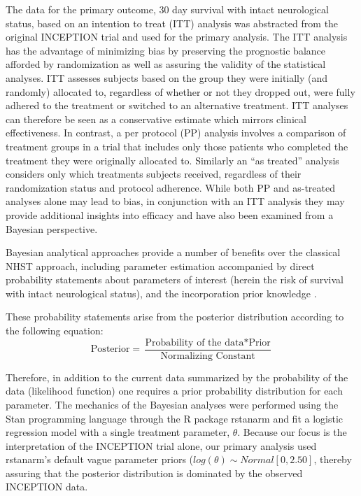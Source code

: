 \documentclass[
  super,
  preprint,
  3p]{elsarticle}
\begin{document}
The data for the primary outcome, 30 day survival with intact
neurological status, based on an intention to treat (ITT) analysis was
abstracted from the original INCEPTION trial \citep{CPR2023a} and used
for the primary analysis. The ITT analysis has the advantage of
minimizing bias by preserving the prognostic balance afforded by
randomization as well as assuring the validity of the statistical
analyses. ITT assesses subjects based on the group they were initially
(and randomly) allocated to, regardless of whether or not they dropped
out, were fully adhered to the treatment or switched to an alternative
treatment. ITT analyses can therefore be seen as a conservative estimate
which mirrors clinical effectiveness. In contrast, a per protocol (PP)
analysis involves a comparison of treatment groups in a trial that
includes only those patients who completed the treatment they were
originally allocated to. Similarly an ``as treated'' analysis considers
only which treatments subjects received, regardless of their
randomization status and protocol adherence. While both PP and
as-treated analyses alone may lead to bias, in conjunction with an ITT
analysis they may provide additional insights into efficacy and have
also been examined from a Bayesian perspective.

Bayesian analytical approaches provide a number of benefits over the
classical NHST approach, including parameter estimation accompanied by
direct probability statements about parameters of interest (herein the
risk of survival with intact neurological status), and the incorporation
prior knowledge \citep{BrophyCardio, Zampieri}.

These probability statements arise from the posterior distribution
according to the following equation:
\[ \text{Posterior}  = \frac{\text{Probability of the data} * \text{Prior}}{\text{Normalizing Constant}} \]

Therefore, in addition to the current data summarized by the probability
of the data (likelihood function) one requires a prior probability
distribution for each parameter. The mechanics of the Bayesian analyses
were performed using the Stan programming language \citep{stan} through
the R package rstanarm \citep{rstanarm} and fit a logistic regression
model with a single treatment parameter, \(\theta\). Because our focus
is the interpretation of the INCEPTION trial alone, our primary analysis
used rstanarm's default vague parameter priors
(\(log(\theta) \sim Normal [0, 2.50]\), thereby assuring that the
posterior distribution is dominated by the observed INCEPTION data.
\end{document}
